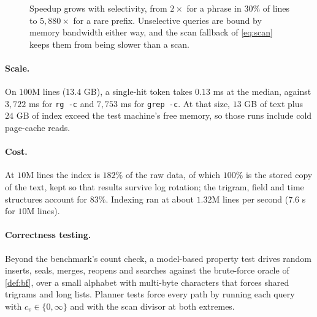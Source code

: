 \documentclass[11pt]{article}
\theoremstyle{plain}
\theoremstyle{definition}
\theoremstyle{remark}
\newcommand{\code}[1]{\texttt{#1}}
\begin{document}
\begin{figure}[htbp]
\centering
{}
\caption{Speedup grows with selectivity, from $2\times$ for a phrase in $30\%$ of
lines to $5{,}880\times$ for a rare prefix. Unselective queries are bound by
memory bandwidth either way, and the scan fallback of \cref{eq:scan} keeps them
from being slower than a scan.}
\label{fig:speedup}
\end{figure}

\paragraph{Scale.} On $100$M lines ($13.4$ GB), a single-hit token takes
$0.13$ ms at the median, against $3{,}722$ ms for \code{rg -c} and $7{,}753$ ms for
\code{grep -c}. At that size, $13$ GB of text plus $24$ GB of index exceed the test
machine's free memory, so those runs include cold page-cache reads.

\paragraph{Cost.} At $10$M lines the index is $182\%$ of the raw data, of which
$100\%$ is the stored copy of the text, kept so that results survive log
rotation; the trigram, field and time structures account for $83\%$. Indexing
ran at about $1.32$M lines per second ($7.6$ s for $10$M lines).

\paragraph{Correctness testing.} Beyond the benchmark's count check, a
model-based property test drives random inserts, seals, merges, reopens and
searches against the brute-force oracle of \cref{def:bf}, over a small alphabet
with multi-byte characters that forces shared trigrams and long lists. Planner
tests force every path by running each query with $c_v \in \{0, \infty\}$ and
with the scan divisor at both extremes.
\end{document}
